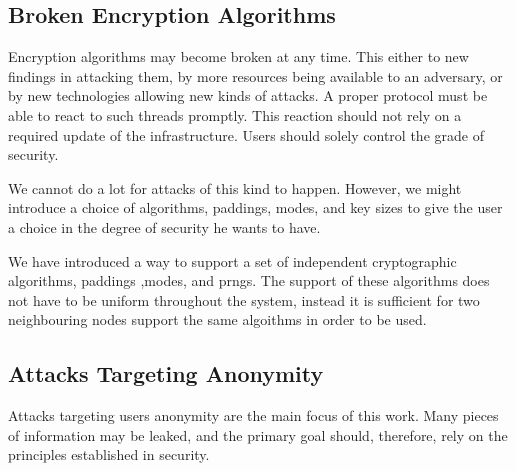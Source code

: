 \subsection{Broken Encryption Algorithms}
Encryption algorithms may become broken at any time. This either to new findings in attacking them, by more resources being available to an adversary, or by new technologies allowing new kinds of attacks. A proper protocol must be able to react to such threads promptly. This reaction should not rely on a required update of the infrastructure. Users should solely control the grade of security. 

We cannot do a lot for attacks of this kind to happen. However, we might introduce a choice of algorithms, paddings, modes, and key sizes to give the user a choice in the degree of security he wants to have.

We have introduced a way to support a set of independent cryptographic algorithms, paddings ,modes, and prngs. The support of these algorithms does not have to be uniform throughout the system, instead it is sufficient for two neighbouring nodes support the same algoithms in order to be used. 

\subsection{Attacks Targeting Anonymity}
Attacks targeting users anonymity are the main focus of this work. Many pieces of information may be leaked, and the primary goal should, therefore, rely on the principles established in security.

